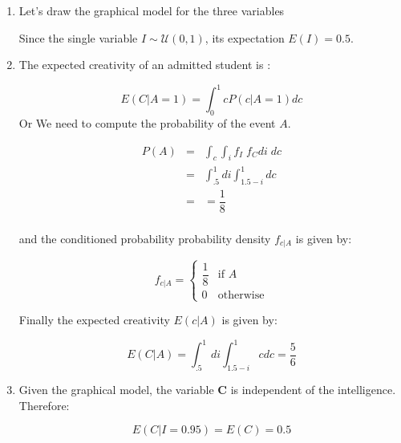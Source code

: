 \documentclass[10pt]{article}
\begin{document}
\begin{enumerate}[label=(\alph*)]
\item Let's draw the graphical model for the three variables

  \begin{center}
    \end{center}
Since the single variable $I\sim \mathcal{U}(0,1)$, its expectation $E(I) = 0.5$.
\item The expected creativity of an admitted student is :

 \begin{equation}
   E(C | A = 1) = \int_0^1 c P(c|A=1)dc
   \end{equation}
Or We need to compute the probability of the event $A$.

\begin{eqnarray}
  P(A) &=& \int_c \int_i f_I\;f_C di\;dc\\
       &=& \int_{.5}^1 di\int_{1.5-i}^1dc\\
       &=&=\dfrac{1}{8} \\
\end{eqnarray}

and the conditioned probability probability density $f_{c|A}$ is given by:

\begin{equation}
  f_{c|A}=\left\{\begin{array}{ll}
      \dfrac{1}{8} & \text{if } A\\[8pt]
      0            & \text{otherwise}
  \end{array}\right.
\end{equation}

Finally the expected creativity $E(c|A)$ is given by:

\begin{equation}
  E(C|A) = \int_{.5}^1di\int_{1.5-i}^1 cdc = \dfrac{5}{6}
\end{equation}

\item Given the graphical model, the variable $\mathbf{C}$ is independent of the
  intelligence.
  Therefore:

  \begin{equation}
    E(C|I=0.95) = E(C) = 0.5
  \end{equation}


\end{enumerate}
\end{document}
